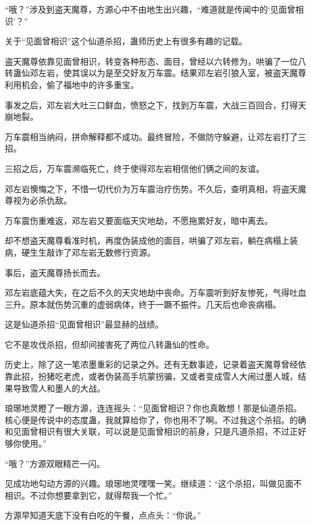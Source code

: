 
\begin{this_body}

“哦？”涉及到盗天魔尊，方源心中不由地生出兴趣，“难道就是传闻中的‘见面曾相识’？”

关于“见面曾相识”这个仙道杀招，蛊师历史上有很多有趣的记载。

盗天魔尊依靠见面曾相识，转变各种形态、面目，曾经以六转修为，哄骗了一位八转蛊仙邓左岩，使其误以为是至交好友万车震。结果邓左岩引狼入室，被盗天魔尊利用机会，偷了福地中的许多重宝。

事发之后，邓左岩大吐三口鲜血，愤怒之下，找到万车震，大战三百回合，打得天崩地裂。

万车震相当纳闷，拼命解释都不成功。最终冒险，不做防守躲避，让邓左岩打了三招。

三招之后，万车震濒临死亡，终于使得邓左岩相信他们俩之间的友谊。

邓左岩懊悔之下，不惜一切代价为万车震治疗伤势。不久后，查明真相，将盗天魔尊视为必杀仇敌。

万车震伤重难返，邓左岩又要面临天灾地劫，不愿拖累好友，暗中离去。

却不想盗天魔尊看准时机，再度伪装成他的面目，哄骗了邓左岩，躺在病榻上装病，硬生生敲诈了邓左岩无数修行资源。

事后，盗天魔尊扬长而去。

邓左岩底蕴大失，在之后不久的天灾地劫中丧命。万车震听到好友惨死，气得吐血三升。原本就伤势沉重的虚弱病体，终于一蹶不振件。几天后也命丧病榻。

这是仙道杀招“见面曾相识”最显赫的战绩。

它不是攻伐杀招，但却间接害死了两位八转蛊仙的性命。

历史上，除了这一笔浓墨重彩的记录之外。还有无数事迹，记录着盗天魔尊曾经依靠此招，扮猪吃老虎，或者伪装高手坑蒙拐骗，又或者变成雪人大闹过墨人城，结果导致雪人和墨人的大战。

琅琊地灵瞪了一眼方源，连连摇头：“见面曾相识？你也真敢想！那是仙道杀招。核心便是传说中的态度蛊，我就算给你了，你也用不了啊。不过我这个杀招。的确和见面曾相识有很大关联，可以说是见面曾相识的前身，只是凡道杀招，不过正好够你使用。”

“哦？”方源双眼精芒一闪。

见成功地勾动方源的兴趣。琅琊地灵嘿嘿一笑。继续道：“这个杀招，叫做见面不相识。不过你想要拿到它，就得帮我一个忙。”

方源早知道天底下没有白吃的午餐，点点头：“你说。”


\end{this_body}
